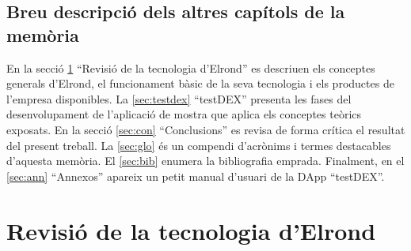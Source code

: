 \documentclass[11pt,a4paper]{article}
\begin{document}
\subsection{Breu descripció dels altres capítols de la memòria}
En la secció \ref{sec:revelrond} ``Revisió de la tecnologia d'Elrond'' es descriuen els conceptes generals d'Elrond, el funcionament bàsic de la seva tecnologia i els productes de l'empresa disponibles. La \ref{sec:testdex} ``testDEX'' presenta les fases del desenvolupament de l'aplicació de mostra que aplica els conceptes teòrics exposats. En la secció \ref{sec:con} ``Conclusions'' es revisa de forma crítica el resultat del present treball. La \ref{sec:glo} és un compendi d'acrònims i termes destacables d'aquesta memòria. El \ref{sec:bib} enumera la bibliografia emprada. Finalment, en el \ref{sec:ann} ``Annexos'' apareix un petit manual d'usuari de la DApp ``testDEX''.

\clearpage

\section{Revisió de la tecnologia d'Elrond}\label{sec:revelrond}
\end{document}
